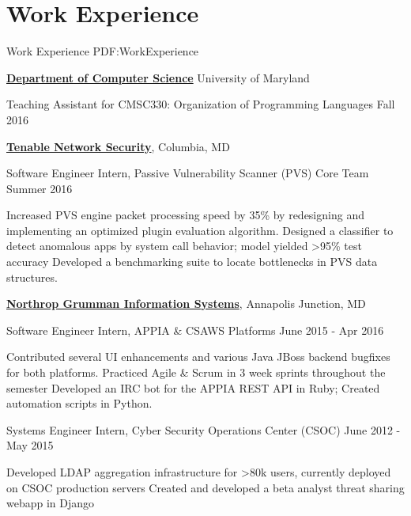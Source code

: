 
\section
{Work Experience}
{Work Experience}
{PDF:WorkExperience}

\href{https://cs.umd.edu/}
{\textbf{Department of Computer Science}}
University of Maryland
\hfill

\GapNoBreak
\hspace{1em} Teaching Assistant for CMSC330: Organization of Programming Languages
\hfill
Fall 2016

\GapNoBreak
\href{https://www.tenable.com/}
{\textbf{Tenable Network Security}},
Columbia, MD

\GapNoBreak
\hspace{1em} Software Engineer Intern, Passive Vulnerability Scanner (PVS) Core Team
\hfill
Summer 2016
\begin{detail}
\SubBulletItem
Increased PVS engine packet processing speed by 35\% by redesigning and implementing an optimized plugin evaluation algorithm.
\SubBulletItem
Designed a classifier to detect anomalous apps by system call behavior; model yielded >95\% test accuracy
\SubBulletItem
Developed a benchmarking suite to locate bottlenecks in PVS data structures.
\end{detail}

\Gap
\href{https://www.ngc.com/}
{\textbf{Northrop Grumman Information Systems}},
Annapolis Junction, MD

\GapNoBreak
\hspace{1em} 
Software Engineer Intern, APPIA \& CSAWS Platforms
\hfill
June 2015 - Apr 2016
\begin{detail}
\SubBulletItem
Contributed several UI enhancements and various Java JBoss backend bugfixes for both platforms.
\SubBulletItem
Practiced Agile \& Scrum in 3 week sprints throughout the semester
\SubBulletItem
Developed an IRC bot for the APPIA REST API in Ruby; Created automation scripts in Python.
\end{detail}

\GapNoBreak
\hspace{1em} 
Systems Engineer Intern, Cyber Security Operations Center (CSOC)
\hfill
June 2012 - May 2015
\begin{detail}
\SubBulletItem
Developed LDAP aggregation infrastructure for >80k users, currently deployed on CSOC production servers
\SubBulletItem
Created and developed a beta analyst threat sharing webapp in Django
\end{detail}

